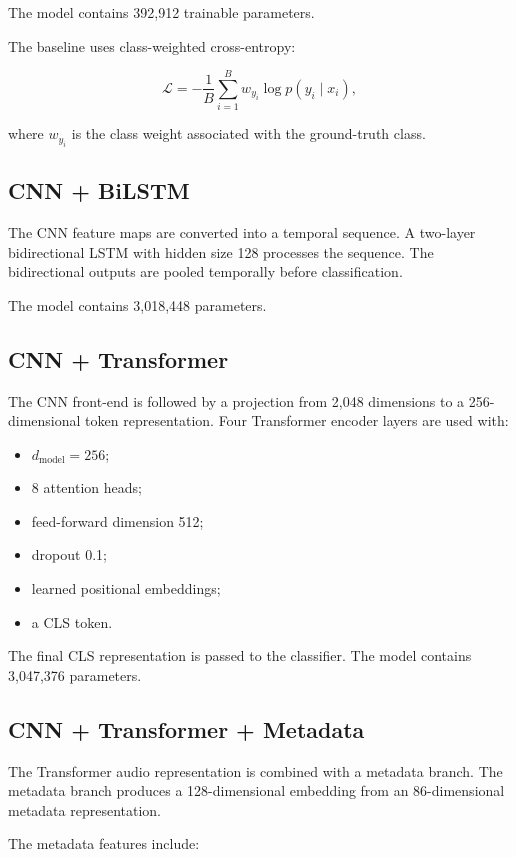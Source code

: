 \documentclass[11pt,a4paper]{article}
\begin{document}
The model contains 392,912 trainable parameters.

The baseline uses class-weighted cross-entropy:

\[
\mathcal{L}
=
-\frac{1}{B}
\sum_{i=1}^{B}
w_{y_i}\log p(y_i\mid x_i),
\]

where \(w_{y_i}\) is the class weight associated with the ground-truth class.

\subsection{CNN + BiLSTM}

The CNN feature maps are converted into a temporal sequence. A two-layer bidirectional LSTM with hidden size 128 processes the sequence. The bidirectional outputs are pooled temporally before classification.

The model contains 3,018,448 parameters.

\subsection{CNN + Transformer}

The CNN front-end is followed by a projection from 2,048 dimensions to a 256-dimensional token representation. Four Transformer encoder layers are used with:

\begin{itemize}
    \item \(d_{\mathrm{model}}=256\);
    \item 8 attention heads;
    \item feed-forward dimension 512;
    \item dropout 0.1;
    \item learned positional embeddings;
    \item a CLS token.
\end{itemize}

The final CLS representation is passed to the classifier. The model contains 3,047,376 parameters.

\subsection{CNN + Transformer + Metadata}

The Transformer audio representation is combined with a metadata branch. The metadata branch produces a 128-dimensional embedding from an 86-dimensional metadata representation.

The metadata features include:
\end{document}
